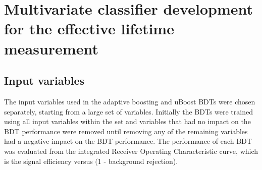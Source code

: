\chapter[Multivariate classifier development]{{\bf Multivariate classifier development for the \bothmath{\bsmumu} effective lifetime measurement}}
\label{sec:appendix2}


\section{Input variables}





The input variables used in the adaptive boosting and uBoost BDTs were chosen separately, starting from a large set of variables. %
Initially the BDTs were trained using all input variables within the set and variables that had no impact on the BDT performance were removed until removing any of the remaining variables had a negative impact on the BDT performance. The performance of each BDT was evaluated from the integrated Receiver Operating Characteristic curve, which is the signal efficiency versus (1 - background rejection). %


